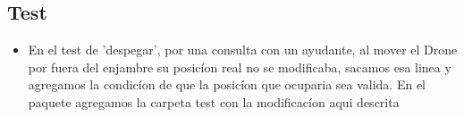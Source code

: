 \subsection{Test}

\begin{itemize}
\item{En el test de 'despegar', por una consulta con un ayudante, al mover el Drone por fuera del enjambre su posic\'ion real no se modificaba, sacamos esa linea y agregamos la condic\'ion de que la posic\'ion que ocuparia sea valida. En el paquete agregamos la carpeta test con la modificac\'ion aqui descrita}
\end{itemize}